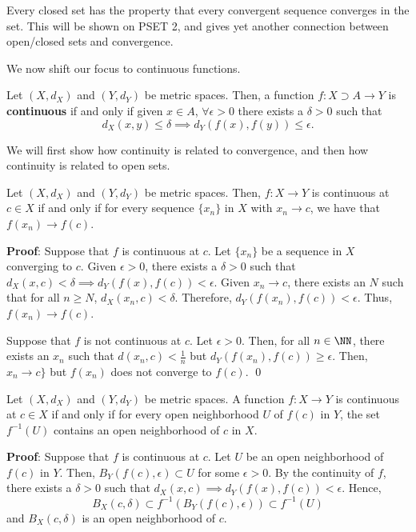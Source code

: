 \begin{remark}
Every closed set has the property that every convergent sequence converges in the set. This will be shown on PSET 2, and gives yet another connection between open/closed sets and convergence.
\end{remark}

We now shift our focus to continuous functions. 
\begin{recall*}
Let $(X,d_X)$ and $(Y,d_Y)$ be metric spaces. Then, a function $f: X \supset A \to Y$ is \textbf{continuous} if and only if given $x\in A$, $\forall \epsilon >0$ there exists a $\delta >0$ such that 
\[
d_X(x,y) \leq \delta \implies d_Y(f(x), f(y)) \leq \epsilon.
\]
\end{recall*}

We will first show how continuity is related to convergence, and then how continuity is related to open sets.
\begin{theorem}
Let $(X,d_X)$ and $(Y, d_Y)$ be metric spaces. Then, $f:X\to Y$ is continuous at $c\in X$ if and only if for every sequence $\{x_n\}$ in $X$ with $x_n \to c$, we have that $f(x_n) \to f(c)$.
\end{theorem}
\textbf{Proof}: Suppose that $f$ is continuous at $c$. Let $\{x_n\}$ be a sequence in $X$ converging to $c$. Given $\epsilon>0$, there exists a $\delta>0$ such that $d_X(x,c) <\delta \implies d_Y(f(x),f(c))<\epsilon$. Given $x_n\to c$, there exists an $N$ such that for all $n\geq N$, $d_X(x_n, c) <\delta$. Therefore, $d_Y(f(x_n), f(c))<\epsilon$. Thus, $f(x_n) \to f(c)$. 

Suppose that $f$ is not continuous at $c$. Let $\epsilon>0.$ Then, for all $n\in \NN$, there exists an $x_n$ such that $d(x_n,c) < \frac{1}{n}$ but $d_Y(f(x_n),f(c))\geq \epsilon$. Then, $x_n\to c\}$ but $f(x_n)$ does not converge to $f(c).$ \qed 

\begin{lemma}
Let $(X,d_X)$ and $(Y,d_Y)$ be metric spaces. A function $f: X\to Y$ is continuous at $c\in X$ if and only if for every open neighborhood $U$ of $f(c)$ in $Y$, the set $f^{-1}(U)$ contains an open neighborhood of $c$ in $X$.
\end{lemma}
\textbf{Proof}: Suppose that $f$ is continuous at $c$. Let $U$ be an open neighborhood of $f(c)$ in $Y$. Then, $B_Y(f(c),\epsilon) \subset U$ for some $\epsilon>0$. By the continuity of $f$, there exists a $\delta >0$ such that $d_X(x,c) \implies d_Y(f(x),f(c)) <\epsilon$. Hence, 
\[
B_X(c,\delta) \subset f^{-1}(B_Y(f(c),\epsilon)) \subset f^{-1}(U)
\]
and $B_X(c,\delta)$ is an open neighborhood of $c$.


